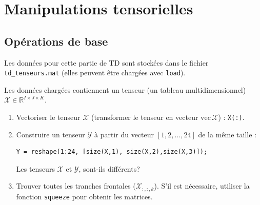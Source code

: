 \chapter{Manipulations tensorielles}

\section{Opérations de base}
Les données pour cette partie de TD sont stockées dans le fichier \lstinline{td_tenseurs.mat} (elles peuvent être chargées avec \lstinline{load}).

Les données chargées contiennent un tenseur (un tableau multidimensionnel) $\mathcal{X} \in \mathbb{R}^{I \times J\times K}$.
\begin{enumerate}
\item Vectoriser le tenseur  $\mathcal{X}$ (transformer le tenseur en  vecteur $\textrm{vec}\, \mathcal{X}$) : {\tt X(:)}. 
\item Construire un tenseur $\mathcal{Y}$ à partir du vecteur $[1,2, \ldots, 24]$ de la même taille :
\begin{lstlisting}
Y = reshape(1:24, [size(X,1), size(X,2),size(X,3)]);
\end{lstlisting}
Les tenseurs $\mathcal{X}$ et  $\mathcal{Y}$, sont-ils différents?

\item Trouver toutes les tranches frontales ($\mathcal{X}_{:,:,k}$). S'il est nécessaire, utiliser la fonction {\tt squeeze} pour obtenir les matrices.
\end{enumerate}

